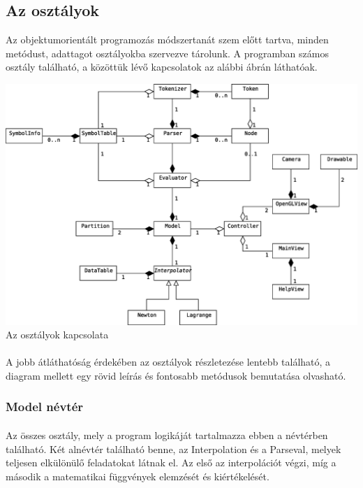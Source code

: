 \documentclass[12pt]{report}
\begin{document}
\subsection{Az osztályok}
Az objektumorientált programozás módszertanát szem előtt tartva, minden metódust, adattagot osztályokba szervezve tárolunk. A programban számos osztály található, a közöttük lévő kapcsolatok az alábbi ábrán láthatóak.
\begin{center}
\includegraphics[width=14cm]{pics/uml/classes}\\
{\footnotesize Az osztályok kapcsolata}
\end{center}
\paragraph{}
A jobb átláthatóság érdekében az osztályok részletezése lentebb található, a diagram mellett egy rövid leírás és fontosabb metódusok bemutatása olvasható.

\subsubsection{Model névtér}
\paragraph{}
Az összes osztály, mely a program logikáját tartalmazza ebben a névtérben található. Két alnévtér található benne, az Interpolation és a Parseval, melyek teljesen elkülönülő feladatokat látnak el. Az első az interpolációt végzi, míg a második a matematikai függvények elemzését és kiértékelését.
\end{document}
